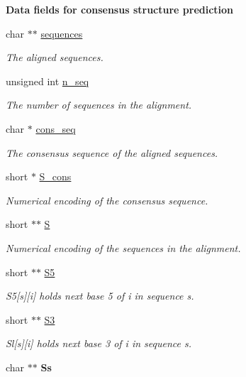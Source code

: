 \begin{Indent}{\bf Data fields for consensus structure prediction}\par
\begin{DoxyCompactItemize}
\item 
char $\ast$$\ast$ \hyperlink{group__fold__compound_a965dbb42f2e13cace5aa3bbab4396530}{sequences}
\begin{DoxyCompactList}\small\item\em The aligned sequences. \end{DoxyCompactList}\item 
unsigned int \hyperlink{group__fold__compound_a614702ab74478e786272be44f8cebfe3}{n\+\_\+seq}
\begin{DoxyCompactList}\small\item\em The number of sequences in the alignment. \end{DoxyCompactList}\item 
char $\ast$ \hyperlink{group__fold__compound_ac472afde64d8b3c8b84e4809fda7d814}{cons\+\_\+seq}
\begin{DoxyCompactList}\small\item\em The consensus sequence of the aligned sequences. \end{DoxyCompactList}\item 
short $\ast$ \hyperlink{group__fold__compound_aa3fab7ae38ebfed2028375221d295686}{S\+\_\+cons}
\begin{DoxyCompactList}\small\item\em Numerical encoding of the consensus sequence. \end{DoxyCompactList}\item 
short $\ast$$\ast$ \hyperlink{group__fold__compound_aebb37297f92c7bd22aac6343f8f61d61}{S}
\begin{DoxyCompactList}\small\item\em Numerical encoding of the sequences in the alignment. \end{DoxyCompactList}\item 
short $\ast$$\ast$ \hyperlink{group__fold__compound_a78d089b475e2230bd536b9a6ed8bb17c}{S5}
\begin{DoxyCompactList}\small\item\em S5\mbox{[}s\mbox{]}\mbox{[}i\mbox{]} holds next base 5\textquotesingle{} of i in sequence s. \end{DoxyCompactList}\item 
short $\ast$$\ast$ \hyperlink{group__fold__compound_af6ab2a25b84d2308ee23f6b11b5fd52d}{S3}
\begin{DoxyCompactList}\small\item\em Sl\mbox{[}s\mbox{]}\mbox{[}i\mbox{]} holds next base 3\textquotesingle{} of i in sequence s. \end{DoxyCompactList}\item 
\hypertarget{group__fold__compound_abf4a526147da57db63990892987fea29}{}char $\ast$$\ast$ {\bfseries Ss}\label{group__fold__compound_abf4a526147da57db63990892987fea29}


\end{DoxyCompactItemize}
\end{Indent}
